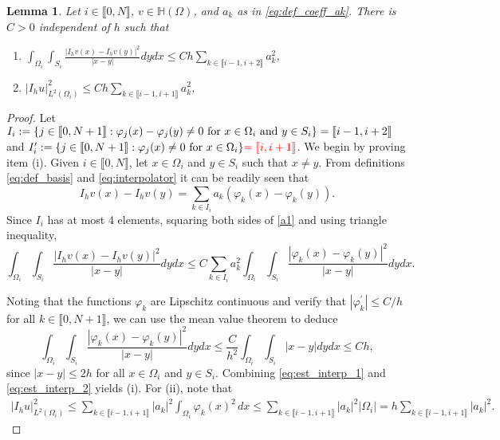 \documentclass[10 pt]{article}
\newcommand\inter[1]{\llbracket #1\rrbracket}
\newtheorem{lemma}[theorem]{Lemma}
\numberwithin{equation}{section}
\newcommand{\B}[1]{{\color{red} #1}}  %
\begin{document}
\begin{lemma}\label{lem:loc_norm_interp}
Let $i\in\inter{0,N}$, $v\in \mathbb H(\Omega)$, and $a_k$ as in \eqref{eq:def_coeff_ak}.  There is $C>0$ independent of $h$ such that
%
\begin{enumerate}[label=\upshape(\roman*)]
\item $\displaystyle \int_{\Omega_i}\int_{S_i}\frac{|I_hv(x)-I_hv(y)|^2}{|x-y|}dy dx\leq Ch\sum_{k\in \inter{i-1,i+2}} a_k^2$,
\item  $\displaystyle |I_h u|^2_{L^2(\Omega_i)}\leq Ch\sum_{k\in \inter{i-1,i+1}} a_k^2$,
\end{enumerate}
\end{lemma}
\begin{proof}
Let $I_i:=\{j\in\inter{0,N+1}:\varphi_j(x)-\varphi_j(y) \neq 0 \ \textnormal{for $x\in \Omega_i$ and $y\in S_i$}\}=\inter{i-1,i+2}$ and  $I^\prime_i:=\{j\in\inter{0,N+1}:\varphi_j(x)\neq 0 \ \textnormal{for $x\in \Omega_i$}\}\B{=\inter{i,i+1}}$. We begin by proving item (i). Given $i\in\inter{0,N}$, let $x\in \Omega_i$ and $y\in S_i$ such that $x\neq y$.  From definitions \eqref{eq:def_basis} and \eqref{eq:interpolator} it can be readily seen that
%
\begin{equation}\label{a1}
    I_hv(x)-I_hv(y)=\sum_{k\in I_i} a_k(\varphi_k(x)-\varphi_k(y)).
\end{equation}
%
Since $I_i$ has at most 4 elements, squaring both sides of \eqref{a1} and using triangle inequality,
%
\begin{equation}\label{eq:est_interp_1}
    \int_{\Omega_i}\int_{S_i}\frac{|I_hv(x)- I_hv(y)|^2}{|x-y|} dy dx \leq C \sum_{k\in I_i} a_k^2\int_{\Omega_i}\int_{S_i} \frac{|\varphi_k(x)- \varphi_k(y)|^2}{|x-y|} dy dx.
\end{equation}
%

Noting that the functions $\varphi_k$ are Lipschitz continuous and verify that $|\varphi_k^\prime|\leq C/h$ for all $k\in\inter{0,N+1}$, we can use the mean value theorem to deduce
%
\begin{equation}\label{eq:est_interp_2}
    \int_{\Omega_i}\int_{S_i}\frac{|\varphi_k(x)-\varphi_k(y)|^2}{|x-y|}dy dx \leq \frac{C}{h^2}\int_{\Omega_i}\int_{S_i}|x-y|dy dx \leq Ch,
\end{equation}
%
since $|x-y|\leq 2h$ for all $x\in \Omega_i$ and $y\in S_i$. Combining \eqref{eq:est_interp_1} and \eqref{eq:est_interp_2} yields (i). For (ii), note that
\begin{align*}
|I_h u|^2_{L^2(\Omega_i)}
\leq \sum_{k\in \inter{i-1,i+1}}|a_k|^2\int_{\Omega_i}\varphi_k(x)^2\, dx
\leq \sum_{k\in \inter{i-1,i+1}}|a_k|^2|\Omega_i|=h\sum_{k\in \inter{i-1,i+1}}|a_k|^2.
\end{align*}
%
\end{proof}
\end{document}
